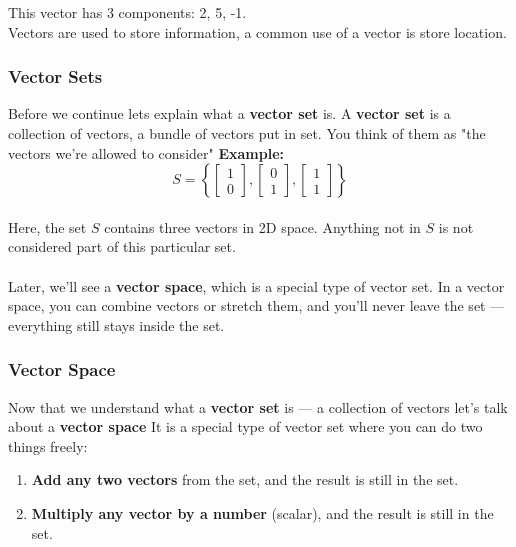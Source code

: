 \documentclass[12pt]{article}
\begin{document}
        This vector has 3 components: 2, 5, -1. \\
        Vectors are used to store information, a common use of a vector is store location.

        \subsubsection{Vector Sets}
            Before we continue lets explain what a \textbf{vector set} is.
            A \textbf{vector set} is a collection of vectors, a bundle of vectors put in set. You think of them as "the vectors we're allowed to consider"
            \textbf{Example:} 
            \begin{equation}
                S = \left\{ 
                    \begin{bmatrix}1\\0\end{bmatrix}, 
                    \begin{bmatrix}0\\1\end{bmatrix}, 
                    \begin{bmatrix}1\\1\end{bmatrix} 
                    \right\}
            \end{equation}
            \\
            Here, the set $S$ contains three vectors in 2D space. Anything not in $S$ is not considered part of this particular set. 
            \\\\
            Later, we'll see a \textbf{vector space}, which is a special type of vector set. In a vector space, you can combine vectors or stretch them, and you’ll never leave the set — everything still stays inside the set.

        \subsubsection{Vector Space}
            Now that we understand what a \textbf{vector set} is — a collection of vectors let's talk about a \textbf{vector space} It is a special type of vector set where you can do two things freely:

            \begin{enumerate}
                \item \textbf{Add any two vectors} from the set, and the result is still in the set.
                \item \textbf{Multiply any vector by a number} (scalar), and the result is still in the set.
            \end{enumerate}
\end{document}
